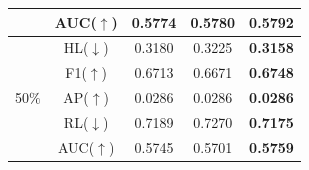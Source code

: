 \documentclass[12pt,a4paper,oneside,english]{report}
\begin{document}
\begin{table}[htbp]
\begin{minipage}[t]{0.48\textwidth}
\begin{tabular}{|c|c|c|c|c|}
            & AUC(\(\uparrow \))   & 0.5774 & 0.5780 & \textbf{0.5792} \\
            \hline
            & HL(\(\downarrow \))  & 0.3180 & 0.3225 & \textbf{0.3158} \\
            & F1(\(\uparrow\))     & 0.6713 & 0.6671 & \textbf{0.6748} \\
            50\(\%\) & AP(\(\uparrow\))   & 0.0286 & 0.0286 & \textbf{0.0286} \\
            & RL(\(\downarrow \))  & 0.7189 & 0.7270 & \textbf{0.7175} \\
            & AUC(\(\uparrow \))   & 0.5745 & 0.5701 & \textbf{0.5759} \\
            \hline
        \end{tabular}
    \end{minipage}
\end{table}

			
			
			
			
\end{document}
